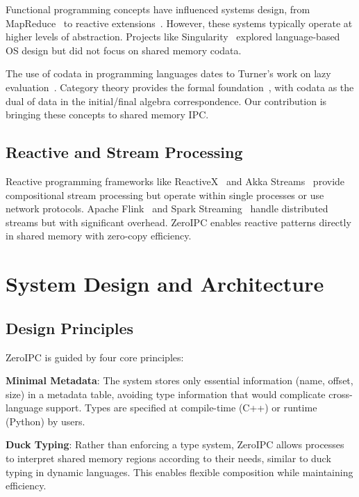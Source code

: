 \documentclass[10pt,conference]{IEEEtran}
\begin{document}
Functional programming concepts have influenced systems design, from MapReduce~\cite{dean2008mapreduce} to reactive extensions~\cite{meijer2012your}. However, these systems typically operate at higher levels of abstraction. Projects like Singularity~\cite{hunt2007singularity} explored language-based OS design but did not focus on shared memory codata.

The use of codata in programming languages dates to Turner's work on lazy evaluation~\cite{turner1979new}. Category theory provides the formal foundation~\cite{hagino1987category}, with codata as the dual of data in the initial/final algebra correspondence. Our contribution is bringing these concepts to shared memory IPC.

\subsection{Reactive and Stream Processing}

Reactive programming frameworks like ReactiveX~\cite{reactivex} and Akka Streams~\cite{akka} provide compositional stream processing but operate within single processes or use network protocols. Apache Flink~\cite{carbone2015apache} and Spark Streaming~\cite{zaharia2013discretized} handle distributed streams but with significant overhead. ZeroIPC enables reactive patterns directly in shared memory with zero-copy efficiency.

\section{System Design and Architecture}

\subsection{Design Principles}

ZeroIPC is guided by four core principles:

\textbf{Minimal Metadata}: The system stores only essential information (name, offset, size) in a metadata table, avoiding type information that would complicate cross-language support. Types are specified at compile-time (C++) or runtime (Python) by users.

\textbf{Duck Typing}: Rather than enforcing a type system, ZeroIPC allows processes to interpret shared memory regions according to their needs, similar to duck typing in dynamic languages. This enables flexible composition while maintaining efficiency.
\end{document}
